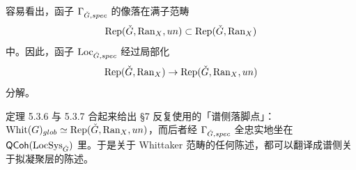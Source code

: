容易看出，函子 $\Gamma_{\check G,spec}$ 的像落在满子范畴
\[
  \operatorname{Rep}(\check G,\mathrm{Ran}_X,un)\subset\operatorname{Rep}(\check G,\mathrm{Ran}_X)
\]
中。因此，函子 $\operatorname{Loc}_{\check G,spec}$ 经过局部化
\[
  \operatorname{Rep}(\check G,\mathrm{Ran}_X)\to\operatorname{Rep}(\check G,\mathrm{Ran}_X,un)
\]
分解。

\begin{annote}
定理 5.3.6 与 5.3.7 合起来给出 §7 反复使用的「谱侧落脚点」：$\mathrm{Whit}(G)_{glob}\simeq\operatorname{Rep}(\check G,\mathrm{Ran}_X,un)$，而后者经 $\Gamma_{\check G,spec}$ 全忠实地坐在 $\mathsf{QCoh}(\operatorname{LocSys}_{\check G})$ 里。于是关于 Whittaker 范畴的任何陈述，都可以翻译成谱侧关于拟凝聚层的陈述。\par\vspace{0.15em}{\raggedleft 【来源：原书 p.10 §5.3.5--5.3.7（A）】\par}
\end{annote}
